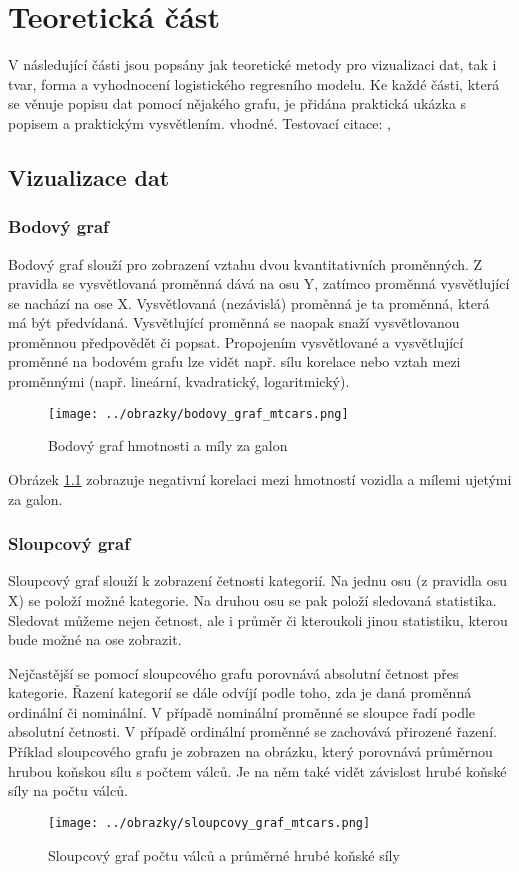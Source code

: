 \chapter{Teoretická část}
V následující části jsou popsány jak teoretické metody pro vizualizaci dat, tak i tvar, forma a vyhodnocení logistického regresního modelu. 
Ke každé části, která se věnuje popisu dat pomocí nějakého grafu, je přidána praktická ukázka s popisem a praktickým vysvětlením.
vhodné.
Testovací citace: \cite{Hebak2015}, \cite{Kleinbaum2010}

\section{Vizualizace dat} \label{sec:vizualizace_dat}
\subsection{Bodový graf}
Bodový graf slouží pro zobrazení vztahu dvou kvantitativních proměnných. Z pravidla se vysvětlovaná proměnná dává na osu Y,
zatímco proměnná vysvětlující se nachází na ose X. Vysvětlovaná (nezávislá) proměnná je ta proměnná, která má být předvídaná.
Vysvětlující proměnná se naopak snaží vysvětlovanou proměnnou předpovědět či popsat. Propojením vysvětlované a vysvětlující proměnné
na bodovém grafu lze vidět např. sílu korelace nebo vztah mezi proměnnými (např. lineární, kvadratický, logaritmický).

\begin{figure}[H]
    \centering
    \texttt{[image: ../obrazky/bodovy\_graf\_mtcars.png]}
    \caption{Bodový graf hmotnosti a míly za galon} 
    \label{fig:bodovy_graf_mtcars}
\end{figure}

Obrázek \ref{fig:bodovy_graf_mtcars} zobrazuje negativní korelaci mezi hmotností vozidla a mílemi ujetými za galon.

\subsection{Sloupcový graf}
Sloupcový graf slouží k zobrazení četnosti kategorií. Na jednu osu (z pravidla osu X) se položí možné kategorie. Na druhou osu
se pak položí sledovaná statistika.
Sledovat můžeme nejen četnost, ale i průměr či kteroukoli jinou statistiku, kterou bude možné na ose zobrazit.

{\color{red}
Nejčastější se pomocí sloupcového grafu porovnává absolutní četnost přes kategorie. Řazení kategorií se dále odvíjí podle toho, zda je
daná proměnná ordinální či nominální. V případě nominální proměnné se sloupce řadí podle absolutní četnosti. V případě ordinální
proměnné se zachovává přirozené řazení.
Příklad sloupcového grafu je zobrazen na obrázku, který porovnává průměrnou hrubou koňskou sílu s počtem válců.
Je na něm také vidět závislost hrubé koňské síly na počtu válců.
}
\begin{figure}[H]
    \centering
    \texttt{[image: ../obrazky/sloupcovy\_graf\_mtcars.png]}
    \caption{Sloupcový graf počtu válců a průměrné hrubé koňské síly} 
    \label{fig:sloupcovy_graf_mtcars}
\end{figure}

